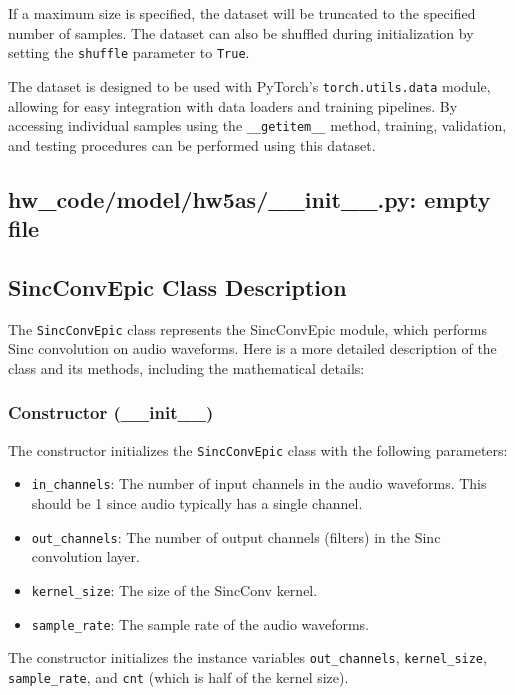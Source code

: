 \documentclass[a4paper]{article}
\begin{document}
If a maximum size is specified, the dataset will be truncated to the specified number of samples. The dataset can also be shuffled during initialization by setting the \texttt{shuffle} parameter to \texttt{True}.

The dataset is designed to be used with PyTorch's \texttt{torch.utils.data} module, allowing for easy integration with data loaders and training pipelines. By accessing individual samples using the \texttt{\_\_getitem\_\_} method, training, validation, and testing procedures can be performed using this dataset.

\subsection{hw\_code/model/hw5as/\_\_init\_\_.py: empty file}

\subsection{SincConvEpic Class Description}

The \texttt{SincConvEpic} class represents the SincConvEpic module, which performs Sinc convolution on audio waveforms. Here is a more detailed description of the class and its methods, including the mathematical details:

\subsubsection{Constructor (\_\_init\_\_)}

The constructor initializes the \texttt{SincConvEpic} class with the following parameters:

\begin{itemize}
    \item \texttt{in\_channels}: The number of input channels in the audio waveforms. This should be 1 since audio typically has a single channel.
    \item \texttt{out\_channels}: The number of output channels (filters) in the Sinc convolution layer.
    \item \texttt{kernel\_size}: The size of the SincConv kernel.
    \item \texttt{sample\_rate}: The sample rate of the audio waveforms.
\end{itemize}

The constructor initializes the instance variables \texttt{out\_channels}, \texttt{kernel\_size}, \texttt{sample\_rate}, and \texttt{cnt} (which is half of the kernel size).
\end{document}
